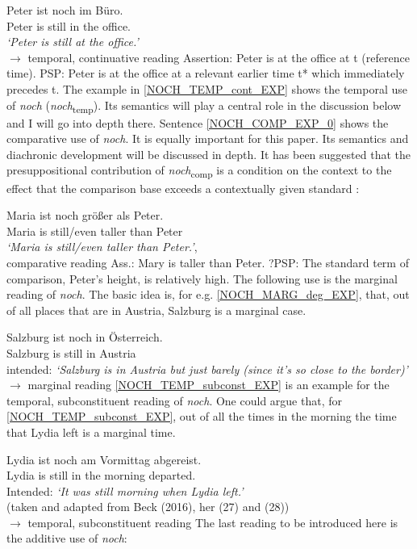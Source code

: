 \documentclass[output=paper,
modfonts
]{langscibook}
\begin{document}
\ea\gll Peter ist noch im Büro.\\
        Peter is still {in the} office.\\
\glt    \textit{`Peter is still at the office.'}\\ \hfill $\rightarrow$ temporal, continuative reading \label{NOCH_TEMP_cont_EXP}
\z
\ea\ea Assertion: Peter is at the office at t (reference time).
\ex      PSP: Peter is at the office at a relevant earlier time t* which immediately precedes t.
\z\z
The example in \ref{NOCH_TEMP_cont_EXP} shows the temporal use of \textit{noch} (\textit{noch}\textsubscript{temp}). Its semantics will play a central role in the discussion below and I will go into depth there. Sentence \ref{NOCH_COMP_EXP_0} shows the comparative use of \textit{noch}. It is equally important for this paper. Its semantics and diachronic development will be discussed in depth. It has been suggested that the presuppositional contribution of \textit{noch}\textsubscript{comp} is a condition on the context to the effect that the comparison base exceeds a contextually given standard \citep[e.g.][]{Hofstetter2013}:

\ea\gll Maria ist noch größer als Peter.\\
       Maria is still/even taller than Peter\\
\glt   \textit{`Maria is still/even taller than Peter.'}, \\ \hfill comparative reading \label{NOCH_COMP_EXP_0}
\z
\ea\ea Ass.: Mary is taller than Peter.
\ex    ?PSP: The standard term of comparison, Peter's height, is relatively high.
\z\z
The following use is the marginal reading of \textit{noch}. The basic idea is, for e.g. \ref{NOCH_MARG_deg_EXP}, that, out of all places that are in Austria, Salzburg is a marginal case.

\ea\gll Salzburg ist noch in Österreich.\\
       Salzburg is still in Austria \\
\glt   intended: \textit{`Salzburg is in Austria but just barely (since it's so close to the border)'} \\ \hfill $\rightarrow$ marginal reading \label{NOCH_MARG_deg_EXP}
\z
\ref{NOCH_TEMP_subconst_EXP} is an example for the temporal, subconstituent reading of \textit{noch}. One could argue that, for \ref{NOCH_TEMP_subconst_EXP}, out of all the times in the morning the time that Lydia left is a marginal time.

\ea\gll Lydia ist noch am Vormittag abgereist.\\
       Lydia is still {in the} morning departed.\\
\glt   Intended: \textit{`It was still morning when Lydia left.'}\\ \hfill \small{(taken and adapted from Beck (2016), her (27) and (28))}\\ \normalsize \hfill $\rightarrow$ temporal, subconstituent reading \label{NOCH_TEMP_subconst_EXP}
\z
The last reading to be introduced here is the additive use of \textit{noch}:
\end{document}
